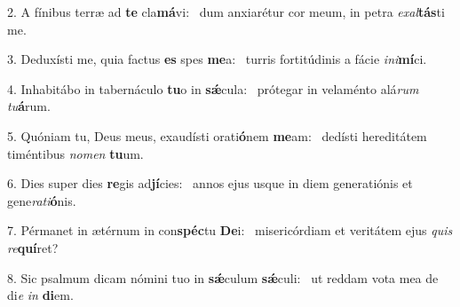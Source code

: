 2. A fínibus terræ ad \textbf{te} cla\textbf{má}vi: \ast\  dum anxiarétur cor meum, in petra \textit{ex}\textit{al}\textbf{tás}ti me.\

3. Deduxísti me, quia factus \textbf{es} spes \textbf{me}a: \ast\  turris fortitúdinis a fácie \textit{in}\textit{i}\textbf{mí}ci.\

4. Inhabitábo in tabernáculo \textbf{tu}o in \textbf{sǽ}cula: \ast\  prótegar in velaménto alá\textit{rum} \textit{tu}\textbf{á}rum.\

5. Quóniam tu, Deus meus, exaudísti orati\textbf{ó}nem \textbf{me}am: \ast\  dedísti hereditátem timéntibus \textit{no}\textit{men} \textbf{tu}um.\

6. Dies super dies \textbf{re}gis ad\textbf{jí}cies: \ast\  annos ejus usque in diem generatiónis et gene\textit{ra}\textit{ti}\textbf{ó}nis.\

7. Pérmanet in ætérnum in con\textbf{spéc}tu \textbf{De}i: \ast\  misericórdiam et veritátem ejus \textit{quis} \textit{re}\textbf{quí}ret?\

8. Sic psalmum dicam nómini tuo in \textbf{sǽ}culum \textbf{sǽ}culi: \ast\  ut reddam vota mea de di\textit{e} \textit{in} \textbf{di}em.\

